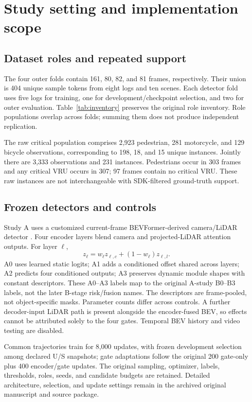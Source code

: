 \documentclass[conference]{IEEEtran}
\begin{document}
\section{Study setting and implementation scope}
\subsection{Dataset roles and repeated support}
The four outer folds contain 161, 80, 82, and 81 frames, respectively. Their union is 404 unique sample tokens from eight logs and ten scenes. Each detector fold uses five logs for training, one for development/checkpoint selection, and two for outer evaluation. Table~\ref{tab:inventory} preserves the original role inventory. Role populations overlap across folds; summing them does not produce independent replication.

The raw critical population comprises 2,923 pedestrian, 281 motorcycle, and 129 bicycle observations, corresponding to 198, 18, and 15 unique instances. Jointly there are 3,333 observations and 231 instances. Pedestrians occur in 303 frames and any critical VRU occurs in 307; 97 frames contain no critical VRU. These raw instances are not interchangeable with SDK-filtered ground-truth support.


\subsection{Frozen detectors and controls}
Study A uses a customized current-frame BEVFormer-derived camera/LiDAR detector \cite{Li2022BEVFormer}. Four encoder layers blend camera and projected-LiDAR attention outputs. For layer $\ell$,
\begin{equation}
z_\ell=w_\ell z_{\ell,c}+(1-w_\ell)z_{\ell,l}.
\end{equation}
A0 uses learned static logits; A1 adds a conditioned offset shared across layers; A2 predicts four conditioned outputs; A3 preserves dynamic module shapes with constant descriptors. These A0--A3 labels map to the original A-study B0--B3 labels, not the later B-stage risk/fusion names. The descriptors are frame-pooled, not object-specific masks. Parameter counts differ across controls. A further decoder-input LiDAR path is present alongside the encoder-fused BEV, so effects cannot be attributed solely to the four gates. Temporal BEV history and video testing are disabled.

Common trajectories train for 8,000 updates, with frozen development selection among declared U/S snapshots; gate adaptations follow the original 200 gate-only plus 400 encoder/gate updates. The original sampling, optimizer, labels, thresholds, roles, seeds, and candidate budgets are retained. Detailed architecture, selection, and update settings remain in the archived original manuscript and source package.
\end{document}
